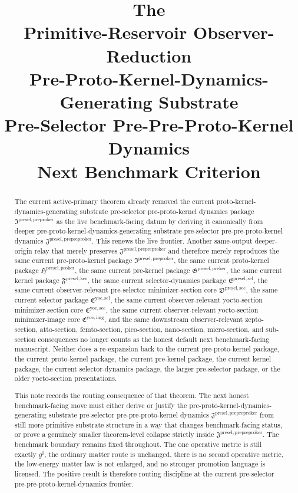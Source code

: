 \documentclass[11pt]{article}
\title{\textbf{The \TheoryName{}}\\[0.4em]
\large Primitive-Reservoir Observer-Reduction\\
\large Pre-Proto-Kernel-Dynamics-Generating Substrate\\
\large Pre-Selector Pre-Pre-Proto-Kernel Dynamics\\
\large Next Benchmark Criterion}
\author{}
\date{}
\newcommand{\CompletedMetric}{g^{\sharp}}
\newcommand{\PrePreProtoKernelPackage}{\mathfrak J^{\mathrm{presel,prepreproker}}}
\newcommand{\PreProtoKernelPackage}{\mathfrak I^{\mathrm{presel,preproker}}}
\newcommand{\ProtoKernelPackage}{\mathfrak H^{\mathrm{presel,proker}}}
\newcommand{\PreKernelPackage}{\mathfrak G^{\mathrm{presel,preker}}}
\newcommand{\KernelPackage}{\mathfrak F^{\mathrm{presel,ker}}}
\newcommand{\PreSectionSelectorPackage}{\mathfrak E^{\mathrm{presel,sel}}}
\newcommand{\PreSelectorMinSectionCore}{\mathfrak D^{\mathrm{presel,sec}}}
\newcommand{\YoctoSelectorPackage}{\mathfrak C^{\mathrm{yoc,sel}}}
\newcommand{\YoctoImageCore}{\mathfrak C^{\mathrm{yoc,img}}}
\newcommand{\YoctoMinSectionCore}{\mathfrak C^{\mathrm{yoc,sec}}}
\begin{document}
\maketitle

\begin{abstract}
The current active-primary theorem already removed the current proto-kernel-dynamics-generating substrate pre-selector pre-proto-kernel dynamics package \(\PreProtoKernelPackage\) as the live benchmark-facing datum by deriving it canonically from deeper pre-proto-kernel-dynamics-generating substrate pre-selector pre-pre-proto-kernel dynamics \(\PrePreProtoKernelPackage\). This renews the live frontier. Another same-output deeper-origin relay that merely preserves \(\PrePreProtoKernelPackage\) and therefore merely reproduces the same current pre-proto-kernel package \(\PreProtoKernelPackage\), the same current proto-kernel package \(\ProtoKernelPackage\), the same current pre-kernel package \(\PreKernelPackage\), the same current kernel package \(\KernelPackage\), the same current selector-dynamics package \(\PreSectionSelectorPackage\), the same current observer-relevant pre-selector minimizer-section core \(\PreSelectorMinSectionCore\), the same current selector package \(\YoctoSelectorPackage\), the same current observer-relevant yocto-section minimizer-section core \(\YoctoMinSectionCore\), the same current observer-relevant yocto-section minimizer-image core \(\YoctoImageCore\), and the same downstream observer-relevant zepto-section, atto-section, femto-section, pico-section, nano-section, micro-section, and sub-section consequences no longer counts as the honest default next benchmark-facing manuscript. Neither does a re-expansion back to the current pre-proto-kernel package, the current proto-kernel package, the current pre-kernel package, the current kernel package, the current selector-dynamics package, the larger pre-selector package, or the older yocto-section presentations.

This note records the routing consequence of that theorem. The next honest benchmark-facing move must either derive or justify the pre-proto-kernel-dynamics-generating substrate pre-selector pre-pre-proto-kernel dynamics \(\PrePreProtoKernelPackage\) from still more primitive substrate structure in a way that changes benchmark-facing status, or prove a genuinely smaller theorem-level collapse strictly inside \(\PrePreProtoKernelPackage\). The benchmark boundary remains fixed throughout. The one operative metric is still exactly \(\CompletedMetric\), the ordinary matter route is unchanged, there is no second operative metric, the low-energy matter law is not enlarged, and no stronger promotion language is licensed. The positive result is therefore routing discipline at the current pre-selector pre-pre-proto-kernel-dynamics frontier.
\end{abstract}
\end{document}
